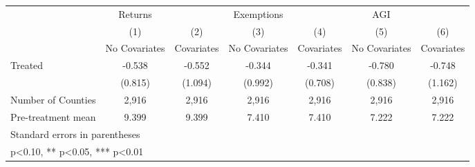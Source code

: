 {
\def\sym#1{\ifmmode^{#1}\else\(^{#1}\)\fi}
\begin{tabular}{l*{6}{c}}
\hline\hline
            &     Returns   &               &  Exemptions   &               &         AGI   &               \\
            &\multicolumn{1}{c}{(1)}&\multicolumn{1}{c}{(2)}&\multicolumn{1}{c}{(3)}&\multicolumn{1}{c}{(4)}&\multicolumn{1}{c}{(5)}&\multicolumn{1}{c}{(6)}\\
            &\multicolumn{1}{c}{No Covariates}&\multicolumn{1}{c}{Covariates}&\multicolumn{1}{c}{No Covariates}&\multicolumn{1}{c}{Covariates}&\multicolumn{1}{c}{No Covariates}&\multicolumn{1}{c}{Covariates}\\
\hline
Treated     &      -0.538   &      -0.552   &      -0.344   &      -0.341   &      -0.780   &      -0.748   \\
            &     (0.815)   &     (1.094)   &     (0.992)   &     (0.708)   &     (0.838)   &     (1.162)   \\
\hline
Number of Counties&       2,916   &       2,916   &       2,916   &       2,916   &       2,916   &       2,916   \\
Pre-treatment mean&       9.399   &       9.399   &       7.410   &       7.410   &       7.222   &       7.222   \\
\hline\hline
\multicolumn{7}{l}{\footnotesize Standard errors in parentheses}\\
\multicolumn{7}{l}{\footnotesize * p<0.10, ** p<0.05, *** p<0.01}\\
\end{tabular}
}
